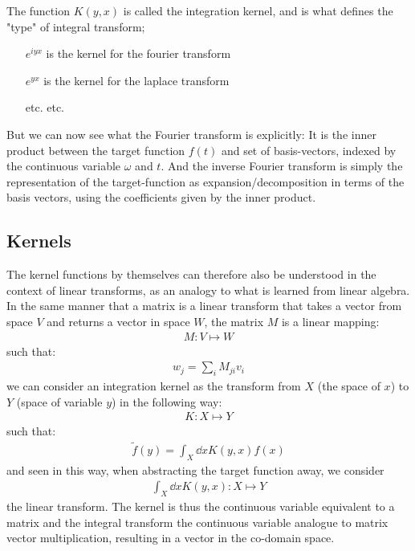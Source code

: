 \documentclass[a4paper,twoside]{article}
\begin{document}
The function $K(y, x)$ is called the integration kernel, and is what defines the "type" of integral transform; 
\begin{itemize}
\item[$e^{i y x}$] is the kernel for the fourier transform
\item[$e^{y x}$] is the kernel for the laplace transform
\item[etc.] etc.
\end{itemize}

But we can now see what the Fourier transform is explicitly: 
It is the inner product between the target function $f(t)$ and set of basis-vectors, indexed by the continuous variable $\omega$ and $t$. 
And the inverse Fourier transform is simply the representation of the target-function as expansion/decomposition in terms of the basis vectors, using the coefficients given by the inner product. 

\subsection{Kernels}
The kernel functions by themselves can therefore also be understood in the context of linear transforms, as an analogy to what is learned from linear algebra. 
In the same manner that a matrix is a linear transform that takes a vector from space $V$ and returns a vector in space $W$, the matrix $M$ is a linear mapping:
\begin{align*}
    M : V \mapsto W
\end{align*}
such that:
\begin{align*}
    w_{j} = \sum_{i} M_{ji}v_{i}
\end{align*}
we can consider an integration kernel as the transform from $X$ (the space of $x$) to $Y$ (space of variable $y$) in the following way:
\begin{align*}
    K : X \mapsto Y
\end{align*}
such that:
\begin{align*}
    \tilde{f}(y) = \int_{X} \dd x K(y, x) f(x)
\end{align*}
and seen in this way, when abstracting the target function away, we consider 
\begin{align*}
    \int_{X} \dd x K(y, x) : X \mapsto Y
\end{align*}
the linear transform. 
The kernel is thus the continuous variable equivalent to a matrix and the integral transform the continuous variable analogue to matrix vector multiplication, resulting in a vector in the co-domain space. 
\end{document}
